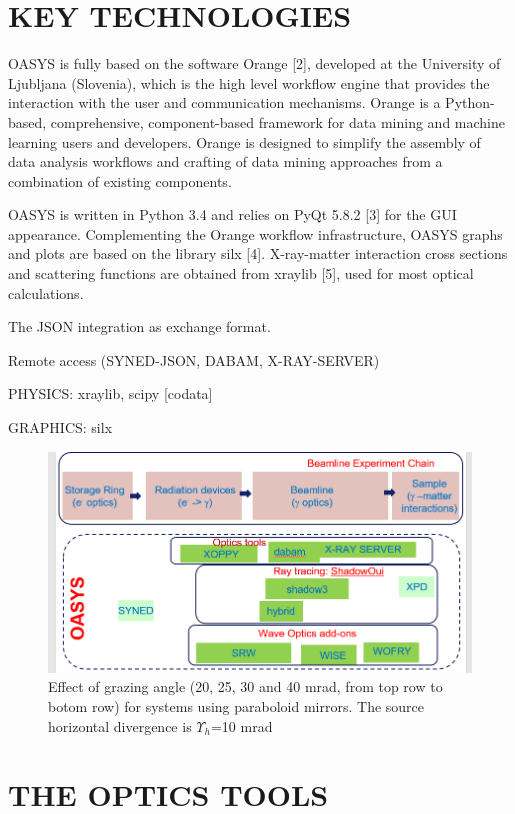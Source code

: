 \documentclass{aip-cp}
\begin{document}
\section{KEY TECHNOLOGIES}

OASYS is fully based on the software Orange [2], developed at the University of Ljubljana (Slovenia), which is the high level workflow engine that provides the interaction with the user and communication mechanisms. Orange is a Python-based, comprehensive, component-based framework for data mining and machine learning users and developers. Orange is designed to simplify the assembly of data analysis workflows and crafting of data mining approaches from a combination of existing components. 

OASYS is written in Python 3.4 and relies on PyQt 5.8.2 [3] for the GUI appearance. Complementing the Orange workflow infrastructure, OASYS graphs and plots are based on the library silx [4]. X-ray-matter interaction cross sections and scattering functions are obtained from xraylib [5], used for most optical calculations.

The JSON integration as exchange format.

Remote access (SYNED-JSON, DABAM, X-RAY-SERVER)

PHYSICS: xraylib, scipy [codata] 

GRAPHICS: silx


\begin{figure}[h]
\includegraphics[width=14cm]{FIGURES/chain.png}
\caption{Effect of grazing angle (20, 25, 30 and 40 mrad, from top row to botom row) for systems using paraboloid mirrors. The source horizontal divergence is $\Upsilon_h$=10 mrad}
\label{figGrazing}
\end{figure}


\section{THE OPTICS TOOLS}
\end{document}
